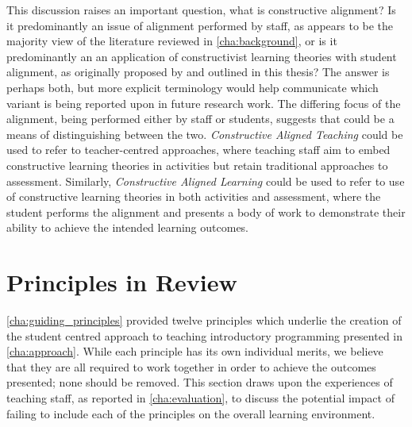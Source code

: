 This discussion raises an important question, what is constructive alignment? Is it predominantly an issue of alignment performed by staff, as appears to be the majority view of the literature reviewed in \cref{cha:background}, or is it predominantly an an application of constructivist learning theories with student alignment, as originally proposed by \citet{Biggs:1996c} and outlined in this thesis? The answer is perhaps both, but more explicit terminology would help communicate which variant is being reported upon in future research work. The differing focus of the alignment, being performed either by staff or students, suggests that could be a means of distinguishing between the two. \emph{Constructive Aligned Teaching} could be used to refer to teacher-centred approaches, where teaching staff aim to embed constructive learning theories in activities but retain traditional approaches to assessment. Similarly, \emph{Constructive Aligned Learning} could be used to refer to use of constructive learning theories in both activities and assessment, where the student performs the alignment and presents a body of work to demonstrate their ability to achieve the intended learning outcomes. 


\section{Principles in Review} %
\label{sec:principles_in_review}

\cref{cha:guiding_principles} provided twelve principles which underlie the creation of the student centred approach to teaching introductory programming presented in \cref{cha:approach}. While each principle has its own individual merits, we believe that they are all required to work together in order to achieve the outcomes presented; none should be removed. This section draws upon the experiences of teaching staff, as reported in \cref{cha:evaluation}, to discuss the potential impact of failing to include each of the principles on the overall learning environment.

